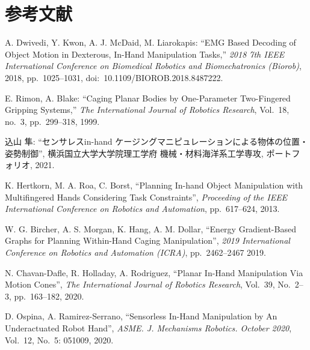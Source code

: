 \documentclass[a4paper,twoside,12pt,papersize, dvipdfmx]{iirthesis}
\begin{document}
    \newcommand{\figref}[1]{\figurename\ref{#1}}
    \newcommand{\tabref}[1]{\tablename\ref{#1}}
    \renewcommand{\eqref}[1]{式~(\ref{#1})}
    \newcommand{\chapref}[1]{\ref{#1}章}
    \newcommand{\secref}[1]{\ref{#1}節}
    \newcommand{\ssecref}[1]{\ref{#1}項}
    \newcommand{\appref}[1]{付録\ref{#1}}
\fi

\chapter{参考文献}\label{chap:bibliography}
\begin{thebibliography}{99}
A. Dwivedi, Y. Kwon, A. J. McDaid, M. Liarokapis:
``EMG Based Decoding of Object Motion in Dexterous, In-Hand Manipulation Tasks,''
{\it 2018 7th IEEE International Conference on Biomedical Robotics and Biomechatronics (Biorob)},
2018, pp.~1025--1031, doi:~10.1109/BIOROB.2018.8487222.

E. Rimon, A. Blake:
``Caging Planar Bodies by One-Parameter Two-Fingered Gripping Systems,''
{\it The International Journal of Robotics Research}, Vol.~18, no.~3, pp.~299--318, 1999.

込山 隼:
``センサレスin-hand ケージングマニピュレーションによる物体の位置・姿勢制御'',
横浜国立大学大学院理工学府 機械・材料海洋系工学専攻, ポートフォリオ, 2021.
  
K. Hertkorn, M. A. Roa, C. Borst,
``Planning In-hand Object Manipulation with Multifingered Hands Considering Task Constraints'',
{\it Proceeding of the IEEE International Conference on Robotics and Automation}, 
pp.~617--624, 2013.

W. G. Bircher, A. S. Morgan, K. Hang, A. M. Dollar,
``Energy Gradient-Based Graphs for Planning Within-Hand Caging Manipulation'',
{\it 2019 International Conference on Robotics and Automation (ICRA)},
pp.~2462--2467
2019.
   
N. Chavan-Dafle, R. Holladay, A. Rodriguez,
``Planar In-Hand Manipulation Via Motion Cones'',
 {\it The International Journal of Robotics Research},
 Vol.~39, No.~2--3, pp.~163--182,
2020.
 	
D. Ospina, A. Ramirez-Serrano,
``Sensorless In-Hand Manipulation by An Underactuated Robot Hand'',
{\it ASME. J. Mechanisms Robotics. October 2020},
Vol.~12, No.~5: 051009, 
2020.


\end{thebibliography}
\end{document}

